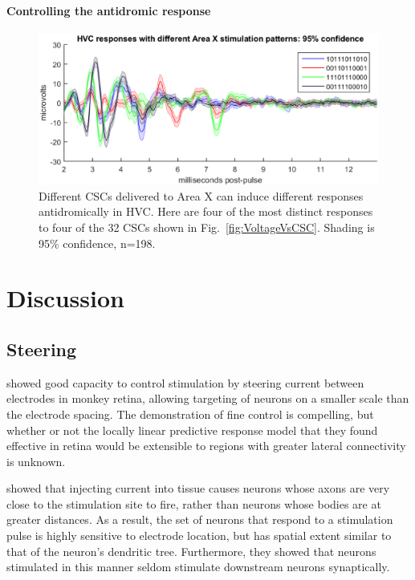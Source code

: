 \documentclass[10pt,letterpaper]{article}
\newcommand\fig[1]{Fig.~\ref{#1}}
\renewcommand{\subsubsection}[1]{\paragraph{#1}}
\begin{document}
\subsubsection{Controlling the antidromic response}

\begin{figure}
  \includegraphics[width=\textwidth]{HVCresponseVsCSC}
  \caption{Different CSCs delivered to Area X can induce different
    responses antidromically in HVC.  Here are four of the most
    distinct responses to four of the 32 CSCs shown in
    \fig{fig:VoltageVsCSC}.  Shading is 95\% confidence, n=198.}
  \label{fig:HVCresponseVsCSC}
\end{figure}


\section{Discussion}

\subsection{Steering}

\cite{Jepson2014steering_in_retina} showed good capacity to control
stimulation by steering current between electrodes in monkey retina,
allowing targeting of neurons on a smaller scale than the electrode
spacing.  The demonstration of fine control is compelling, but whether
or not the locally linear predictive response model that they found
effective in retina would be extensible to regions with greater
lateral connectivity is unknown.

\cite{Histed2009stimulation} showed that injecting current into tissue
causes neurons whose axons are very close to the stimulation site to
fire, rather than neurons whose bodies are at greater distances.  As a
result, the set of neurons that respond to a stimulation pulse is
highly sensitive to electrode location, but has spatial extent similar
to that of the neuron's dendritic tree.  Furthermore, they showed that
neurons stimulated in this manner seldom stimulate downstream neurons
synaptically.
\end{document}
